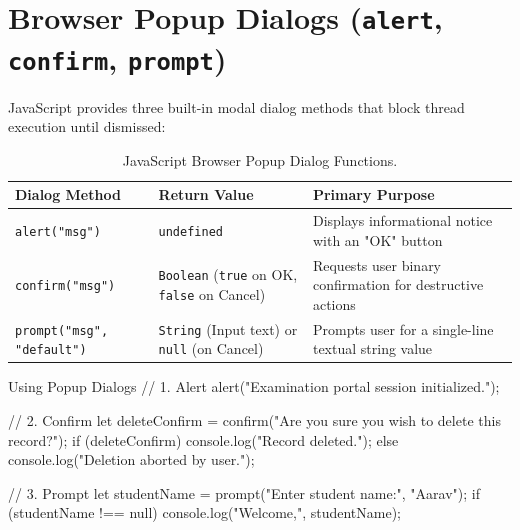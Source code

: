 \section{Browser Popup Dialogs (\texttt{alert}, \texttt{confirm}, \texttt{prompt})}

JavaScript provides three built-in modal dialog methods that block thread execution until dismissed:

\begin{table}[htbp]
\centering
\small
\renewcommand{\arraystretch}{1.3}
\begin{tabularx}{\linewidth}{ll>{\raggedright\arraybackslash}X}
\toprule
\textbf{Dialog Method} & \textbf{Return Value} & \textbf{Primary Purpose} \\
\midrule
\texttt{alert("msg")} & \texttt{undefined} & Displays informational notice with an "OK" button \\
\texttt{confirm("msg")} & \texttt{Boolean} (\texttt{true} on OK, \texttt{false} on Cancel) & Requests user binary confirmation for destructive actions \\
\texttt{prompt("msg", "default")} & \texttt{String} (Input text) or \texttt{null} (on Cancel) & Prompts user for a single-line textual string value \\
\bottomrule
\end{tabularx}
\caption{JavaScript Browser Popup Dialog Functions.}
\label{tab:dialog-functions}
\end{table}

\begin{jscode}{Using Popup Dialogs}
// 1. Alert
alert("Examination portal session initialized.");

// 2. Confirm
let deleteConfirm = confirm("Are you sure you wish to delete this record?");
if (deleteConfirm) {
    console.log("Record deleted.");
} else {
    console.log("Deletion aborted by user.");
}

// 3. Prompt
let studentName = prompt("Enter student name:", "Aarav");
if (studentName !== null) {
    console.log("Welcome,", studentName);
}
\end{jscode}

